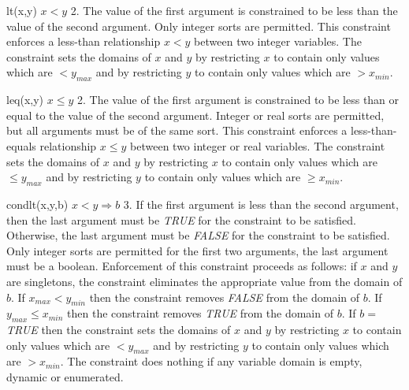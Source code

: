     {lt(x,y)}
    {$x<y$}
    {2.  The value of the first argument is constrained to be less than the 
    value of the second argument.}
    {Only integer sorts are permitted.}
    {This constraint enforces a less-than relationship $x<y$ between two integer 
    variables.  
    The constraint sets the domains of $x$ and $y$ by restricting $x$ to contain
    only values which are $< y_{max}$ and by restricting $y$ to contain
    only values which are $> x_{min}$.}

    {leq(x,y)}
    {$x \leq y$}
    {2.  The value of the first argument is 
    constrained to be less than or equal to the 
    value of the second argument.}
    {Integer or real sorts are permitted, but all arguments must be of the same sort.}
    {This constraint enforces a less-than-equals relationship $x\leq y$
    between two integer or real variables.       
    The constraint sets the domains of $x$ and $y$ by restricting $x$ to contain
    only values which are $\leq y_{max}$ and by restricting $y$ to contain
    only values which are $\geq x_{min}$.}

    {condlt(x,y,b)}
    {$x < y \Rightarrow b$}
    {3.  If the first argument is less than the second argument, then the last
    argument must be {\em TRUE} for the constraint to be satisfied.
    Otherwise, the last argument must be {\em FALSE} for the constraint
    to be satisfied.}
    {Only integer sorts are permitted for the first two arguments, the last argument must be
    a boolean.}
    {Enforcement of this constraint proceeds as follows: if $x$ and $y$ 
    are singletons, the constraint eliminates the appropriate value from the
    domain of $b$.  If $x_{max}<y_{min}$ then the constraint removes
    {\em FALSE} from the domain of $b$.  If $y_{max} \leq x_{min}$ then the constraint removes
    {\em TRUE} from the domain of $b$.  If $b=${\em TRUE} then 
    the constraint sets the domains of $x$ and $y$ by restricting $x$ to contain
    only values which are $< y_{max}$ and by restricting $y$ to contain
    only values which are $> x_{min}$.
    The constraint does nothing if any variable domain is empty, dynamic or enumerated.}    

